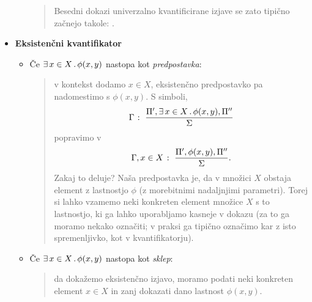 \begin{itemize}
\begin{itemize}
\begin{quote}
						Besedni dokazi univerzalno kvantificirane izjave se zato tipično začnejo takole: .
					\end{quote}
			\end{itemize}
		\item\textbf{Eksistenčni kvantifikator}
			\begin{itemize}
				\item
					Če $\xsome{x}[X]{\phi(x, y)}$ nastopa kot \emph{predpostavka}:
					\begin{quote}
						v kontekst dodamo $x \in X$, eksistenčno predpostavko pa nadomestimo s $\phi(x, y)$. S simboli,
						\[\claim{\Gamma}{\Pi', \xsome{x}[X]{\phi(x, y)}, \Pi''}{\Sigma}\]
						popravimo v
						\[{\Gamma, x \in X} \;\colon\; \frac{\Pi', \phi(x, y), \Pi''}{\Sigma}.\]
						Zakaj to deluje? Naša predpostavka je, da v množici $X$ obstaja element z lastnostjo $\phi$ (z morebitnimi nadaljnjimi parametri). Torej si lahko vzamemo neki konkreten element množice $X$ s to lastnostjo, ki ga lahko uporabljamo kasneje v dokazu (za to ga moramo nekako označiti; v praksi ga tipično označimo kar z isto spremenljivko, kot v kvantifikatorju).
					\end{quote}
				\item
					Če $\xsome{x}[X]{\phi(x, y)}$ nastopa kot \emph{sklep}:
					\begin{quote}
						da dokažemo eksistenčno izjavo, moramo podati neki konkreten element $x \in X$ in zanj dokazati dano lastnost $\phi(x, y)$. 
					\end{quote}
			\end{itemize}
	\end{itemize}
	
